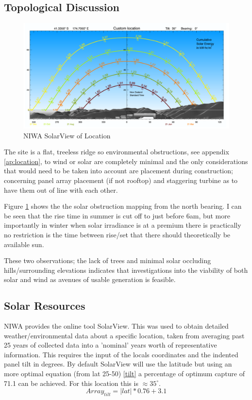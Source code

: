 \documentclass[journal]{IEEEtran}
\begin{document}
        \subsection{Topological Discussion}
        \begin{figure}[h!]
                \centering
                \includegraphics[width=0.75\linewidth]{fig/niwa_solarview.png}
                \caption{NIWA SolarView of Location}
                \label{solarview}
        \end{figure}

        The site is a flat, treeless ridge so environmental obstructions, see appendix \ref{ap:location}, to wind or solar are completely minimal and the only considerations that would need to be taken into account are placement during construction; concerning panel array placement (if not rooftop) and staggering turbine as to have them out of line with each other.

        Figure \ref{solarview} shows the the solar obstruction mapping from the north bearing. I can be seen that the rise time in summer is cut off to just before 6am, but more importantly in winter when solar irradiance is at a premium there is practically no restriction is the time between rise/set that there should theoretically be available sun. 

        These two observations; the lack of trees and minimal solar occluding hills/surrounding elevations indicates that investigations into the viability of both solar and wind as avenues of usable generation is feasible.
        
        \subsection{Solar Resources}
        NIWA provides the online tool SolarView\cite{solarview}. This was used to obtain detailed weather/environmental data about a specific location, taken from averaging past 25 years of collected data into a 'nominal' years worth of representative information. This requires the input of the locals coordinates and the indented panel tilt in degrees. By default SolarView will use the latitude but using an more optimal equation (from lat 25-50) \ref{tilt} a percentage of optimum capture of 71.1 can be achieved. For this location this is $\approx 35^{\circ}$.
        \begin{equation}
                Array_{tilt} = |lat|*0.76 + 3.1
                \label{tilt}
        \end{equation}
\end{document}
